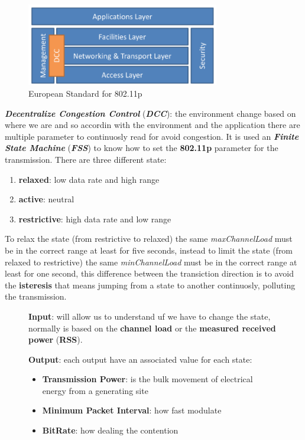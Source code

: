 \begin{figure}[h]
    \centering
    \includegraphics[width=0.75\textwidth]{img/etsi_11p}
    \caption{European Standard for 802.11p}
    \label{fig:etsi_11p}
\end{figure}
\textbf{\textit{Decentralize Congestion Control}} (\textbf{\textit{DCC}}): the environment change based on where we are and so accordin with the environment and the application there are multiple parameter to continuosly read for avoid congestion. It is used an \textbf{\textit{Finite State Machine}} (\textbf{\textit{FSS}}) to know how to set the \textbf{802.11p} parameter for the transmission.
There are three different state:
\begin{enumerate}[nosep]
    \item \textbf{relaxed}: low data rate and high range
    \item \textbf{active}: neutral
    \item \textbf{restrictive}: high data rate and low range
\end{enumerate}
To relax the state (from restrictive to relaxed) the same \textit{maxChannelLoad} must be in the correct range at least for five seconds, instead to limit the state (from relaxed to restrictive) the same \textit{minChannelLoad} must be in the correct range at least for one second, this difference between the transiction direction is to avoid the \textbf{isteresis} that means jumping from a state to another continuosly, polluting the transmission.

\begin{figure}[h]
    \centering
    \begin{minipage}[t]{0.45\textwidth}
        \centering
        \textbf{Input}: will allow us to understand uf we have to change the state, normally is based on the \textbf{channel load} or the \textbf{measured received power} (\textbf{RSS}).
    \end{minipage}
    \begin{minipage}[t]{0.45\textwidth}
        \centering
        \textbf{Output}: each output have an associated value for each state:
        \begin{itemize}[nosep]
            \item \textbf{Transmission Power}: is the bulk movement of electrical energy from a generating site
            \item \textbf{Minimum Packet Interval}: how fast modulate
            \item \textbf{BitRate}: how dealing the contention
        \end{itemize}
    \end{minipage}
\end{figure}

